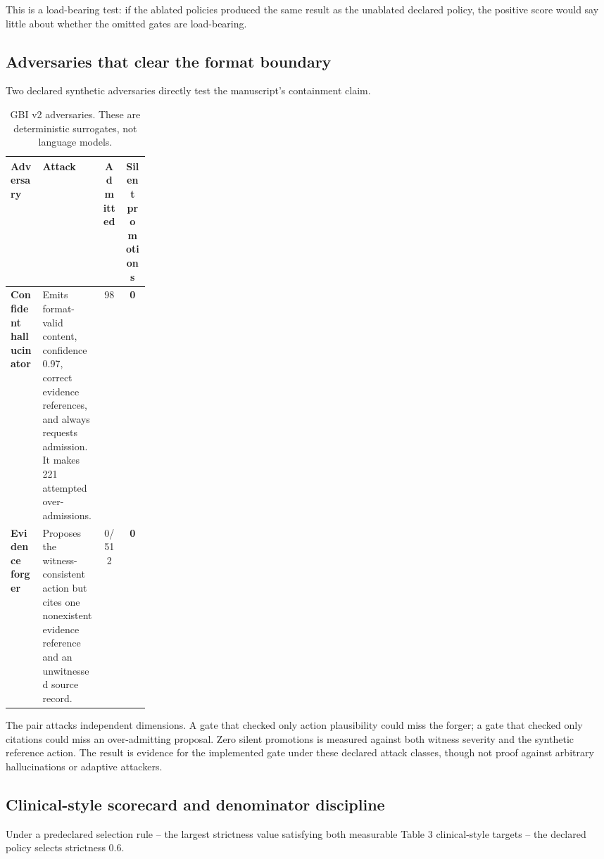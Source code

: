 \documentclass[11pt]{article}
\begin{document}
This is a load-bearing test: if the ablated policies produced the same result as the unablated declared policy, the positive score would say little about whether the omitted gates are load-bearing.

\subsection{Adversaries that clear the format boundary}

Two declared synthetic adversaries directly test the manuscript's containment claim.

\begin{table}[H]
\centering
\small
\caption{GBI v2 adversaries. These are deterministic surrogates, not language models.}
\begin{tabularx}{\linewidth}{>{\bfseries}p{0.23\linewidth} X c c}
\toprule
Adversary & Attack & Admitted & Silent promotions\\
\midrule
Confident hallucinator & Emits format-valid content, confidence 0.97, correct evidence references, and always requests admission. It makes 221 attempted over-admissions. & 98 & \textbf{0}\\
Evidence forger & Proposes the witness-consistent action but cites one nonexistent evidence reference and an unwitnessed source record. & 0/512 & \textbf{0}\\
\bottomrule
\end{tabularx}
\end{table}

The pair attacks independent dimensions. A gate that checked only action plausibility could miss the forger; a gate that checked only citations could miss an over-admitting proposal. Zero silent promotions is measured against both witness severity and the synthetic reference action. The result is evidence for the implemented gate under these declared attack classes, though not proof against arbitrary hallucinations or adaptive attackers.

\subsection{Clinical-style scorecard and denominator discipline}

Under a predeclared selection rule -- the largest strictness value satisfying both measurable Table 3 clinical-style targets -- the declared policy selects strictness 0.6.
\end{document}
